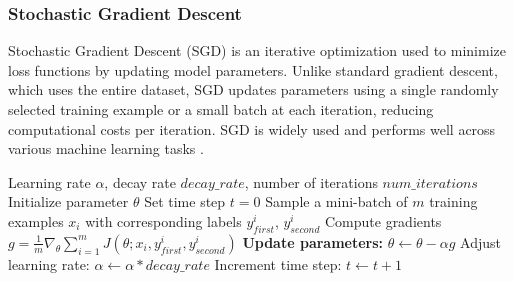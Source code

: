 \documentclass[runningheads]{llncs}
\begin{document}
{%









\subsubsection{Stochastic Gradient Descent}
Stochastic Gradient Descent (SGD) is an iterative optimization used to minimize loss functions by updating model parameters. Unlike standard gradient descent, which uses the entire dataset, SGD updates parameters using a single randomly selected training example or a small batch at each iteration, reducing computational costs per iteration. SGD is widely used and performs well across various machine learning tasks \cite{recht2011hogwild}. 

\begin{algorithm}[H]
\caption{Stochastic Gradient Descent Algorithm Implementation}\label{al1}
\label{alg:example}
\begin{algorithmic}[1]
\Require Learning rate $\alpha$, decay rate $decay\_rate$, number of iterations $num\_iterations$
\State Initialize parameter $\theta$
\State Set time step $t = 0$
    \State Sample a mini-batch of $m$ training examples $x_i$ with corresponding labels $y_{first}^i$, $y_{second}^i$
    \State Compute gradients $g = \frac{1}{m} \nabla_\theta \sum_{i=1}^m J(\theta; x_i, y_{first}^i, y_{second}^i)$
    \State \textbf{Update parameters:} $\theta \leftarrow \theta - \alpha g$
    \State Adjust learning rate: $\alpha \leftarrow \alpha * decay\_rate$
    \State Increment time step: $t \leftarrow t + 1$
\EndFor
\end{algorithmic}
\end{algorithm}

}
\end{document}
